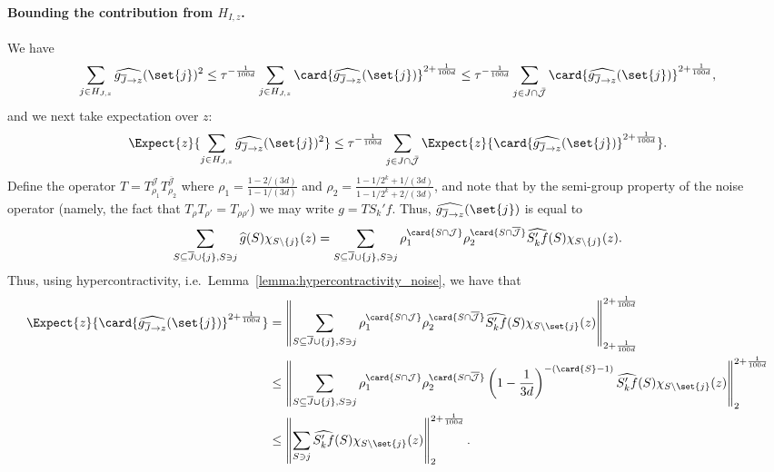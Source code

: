   \paragraph{Bounding the contribution from $H_{I,z}$.}
  We have
  \[
  \sum\limits_{j\in H_{J,z}}\widehat{g_{\overline{J}\rightarrow z}}(\set{j})^2
  \leq \tau^{-\frac{1}{100d}}\sum\limits_{j\in H_{J,z}}\card{\widehat{g_{\overline{J}\rightarrow z}}(\set{j})}^{2+\frac{1}{100d}}
  \leq \tau^{-\frac{1}{100d}}\sum\limits_{j\in J\cap\bar{\mathcal{J}}}\card{\widehat{g_{\overline{J}\rightarrow z}}(\set{j})}^{2+\frac{1}{100d}},
  \]
  and we next take expectation over $z$:
  \begin{equation}\label{eq5}
  \Expect{z}{\sum\limits_{j\in H_{J,z}}\widehat{g_{\overline{J}\rightarrow z}}(\set{j})^2}
  \leq
  \tau^{-\frac{1}{100d}}\sum\limits_{j\in J\cap\bar{\mathcal{J}}}\Expect{z}{\card{\widehat{g_{\overline{J}\rightarrow z}}(\set{j})}^{2+\frac{1}{100d}}}.
  \end{equation}
  Define the operator
  $T = T_{\rho_1}^{\mathcal{J}}T_{\rho_2}^{\overline{\mathcal{J}}}$
  where $\rho_1 = \frac{1-2/(3d)}{1-1/(3d)}$ and $\rho_2 = \frac{1-1/2^k+1/(3d)}{1-1/2^k+2/(3d)}$,
  and note that by the semi-group property of the noise operator (namely, the fact that $T_{\rho}T_{\rho'} = T_{\rho\rho'}$)
  we may write $g = T S_k' f$. Thus, $\widehat{g_{\overline{J}\rightarrow z}}(\set{j})$ is equal to
  \[
  \sum\limits_{S\subseteq \overline{J} \cup\{j\}, S\ni j} \widehat{g}(S)\chi_{S\setminus\{j\}}(z) =
  \sum\limits_{S\subseteq \overline{J} \cup\{j\}, S\ni j}
  \rho_1^{\card{S\cap \mathcal{J}}}
  \rho_2^{\card{S\cap \overline{\mathcal{J}}}}
  \widehat{S_k' f}(S)\chi_{S\setminus\{j\}}(z).
  \]
  Thus, using hypercontractivity, i.e.~Lemma~\ref{lemma:hypercontractivity_noise}, we have that
  \begin{align}\label{eq4}
  \Expect{z}{\card{\widehat{g_{\overline{J}\rightarrow z}}(\set{j})}^{2+\frac{1}{100d}}}
  &=\left\|\sum\limits_{S\subseteq \overline{J} \cup\{j\}, S\ni j}
  \rho_1^{\card{S\cap \mathcal{J}}}
  \rho_2^{\card{S\cap \overline{\mathcal{J}}}}
  \widehat{S_k' f}(S)\chi_{S\setminus\set{j}}(z)\right\|_{2+\frac{1}{100d}}^{2+\frac{1}{100d}}\notag\\
  &\leq \left\|\sum\limits_{S\subseteq \overline{J} \cup\{j\}, S\ni j}
  \rho_1^{\card{S\cap \mathcal{J}}}
  \rho_2^{\card{S\cap \overline{\mathcal{J}}}}
  \left(1-\frac{1}{3d}\right)^{-(\card{S}-1)}\widehat{S_k' f}(S)\chi_{S\setminus\set{j}}(z)\right\|_2^{2+\frac{1}{100d}}\notag\\
  &\leq \left\|\sum\limits_{S\ni j}\widehat{S_k' f}(S)\chi_{S\setminus\set{j}}(z)\right\|_2^{2+\frac{1}{100d}}.
  \end{align}
